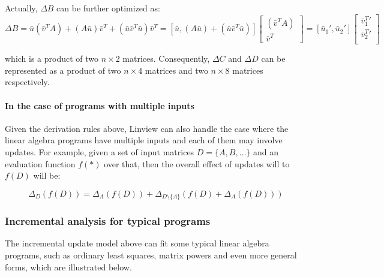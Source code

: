 Actually, $\Delta B$ can be further optimized as:
\begin{equation}\label{eq: update_b_product_opt}
\Delta B = \bar{u}(\bar{v}^TA) + (A\bar{u})\bar{v}^T + (\bar{u}\bar{v}^T\bar{u})\bar{v}^T=[\bar{u}, (A\bar{u}) + (\bar{u}\bar{v}^T\bar{u})]
\begin{bmatrix}
    (\bar{v}^TA)  \\
    \bar{v}^T 
\end{bmatrix}
=[\bar{u}_1', \bar{u}_2']
\begin{bmatrix}
    \bar{v}^T_1'  \\
    \bar{v}^T_2'  \\
\end{bmatrix}
\end{equation}

which is a product of two $n \times 2$ matrices. Consequently, $\Delta C$ and $\Delta D$ can be represented as a product of two $n \times 4$ matrices and two $n \times 8$ matrices respectively.

\paragraph{In the case of programs with multiple inputs}
Given the derivation rules above, Linview can also handle the case where the linear algebra programs have multiple inputs and each of them may involve updates. For example, given a set of input matrices $D=\{A, B, \dots\}$ and an evaluation function $f(*)$ over that, then the overall effect of updates will to $f(D)$ will be:

\begin{equation}\label{eq: updates_by_multi_vars}
\Delta_{D}(f(D)) = \Delta_{A}(f(D)) + \Delta_{D \setminus \{A\}}(f(D) + \Delta_{A}(f(D)))
\end{equation}



\subsubsection{Incremental analysis for typical programs}
The incremental update model above can fit some typical linear algebra programs, such as ordinary least squares, matrix powers and even more general forms, which are illustrated below.


